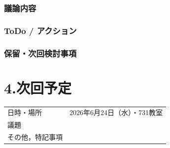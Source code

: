 \documentclass[a4paper,12pt]{ltjsarticle}
\begin{document}
\subsubsection*{議論内容}

\subsubsection*{ToDo / アクション}

\subsubsection*{保留・次回検討事項}

\section*{4.次回予定}
\begin{tabular}{ll}
  \toprule
  日時・場所 & 2026年6月24日（水）・731教室 \\
  議題       &  \\
  その他，特記事項 & \\
  \bottomrule
\end{tabular}
\end{document}

